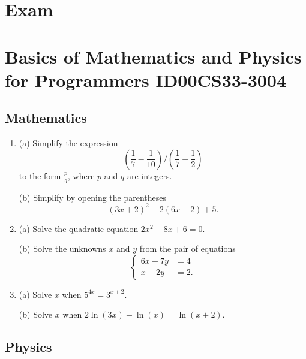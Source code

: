 \documentclass[12pt]{article}
\newcommand{\ratkaisu}[1]{{\color{blue}\quad\textrm{Ratkaisu: } #1}}
\renewcommand{\ratkaisu}[1]{}
\begin{document}
\thispagestyle{empty}

\section*{Exam}
\section*{Basics of Mathematics and Physics for Programmers ID00CS33-3004}
\subsection*{Mathematics}

\begin{enumerate}
\item 
(a) Simplify the expression
$$
\left(\frac{1}{7}-\frac{1}{10}\right)\bigg/\left(\frac{1}{7}+\frac{1}{2}\right)\ratkaisu{1/25}
$$
to the form $\frac{p}{q}$, where $p$ and $q$ are integers.

(b) Simplify by opening the parentheses
$$
(3x+2)^2-2(6x-2)+5.\ratkaisu{9x^2+13}
$$

\item (a) Solve the quadratic equation
$2x^2-8x+6=0$.%

(b) Solve the unknowns $x$ and $y$ from the pair of equations
$$
\begin{cases}
6x+7y&=4\\
x+2y&=2.
\end{cases}\ratkaisu{y=8/5, x=-6/5}
$$


\item (a) Solve $x$ when $5^{4x}=3^{x+2}$.

(b) Solve $x$ when $2\ln(3x)-\ln(x)=\ln(x+2)$.
\end{enumerate}

\subsection*{Physics}
\end{document}
